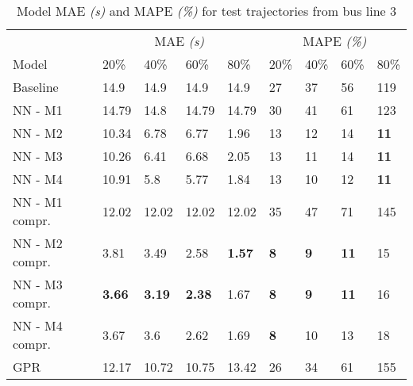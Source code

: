\begin{table}[H]
  \centering
  \caption{Model MAE \textit{(s)} and MAPE \textit{(\%)} for test trajectories from bus line 3}
  \label{tbl:models-mae-and-mape-203}
  \begin{tabular}{l | l | l | l | l || l | l | l | l }
    & \multicolumn{4}{c}{MAE \textit{(s)}} & \multicolumn{4}{c}{MAPE \textit{(\%)}} \\
    Model      & 20\% & 40\% & 60\% & 80\% & 20\% & 40\% & 60\% & 80\% \\
    \hline
    Baseline & 14.9 & 14.9 & 14.9 & 14.9  & 27 & 37 & 56 & 119 \\
    NN - M1        & 14.79& 14.8& 14.79& 14.79& 30& 41& 61& 123 \\
    NN - M2        & 10.34& 6.78& 6.77& 1.96& 13& 12& 14& \textbf{11} \\
    NN - M3       & 10.26& 6.41& 6.68& 2.05& 13& 11& 14& \textbf{11}\\
    NN - M4        & 10.91& 5.8& 5.77& 1.84& 13& 10& 12& \textbf{11} \\
    NN - M1 compr.       & 12.02& 12.02& 12.02& 12.02& 35& 47& 71& 145 \\
    NN - M2 compr.       & 3.81& 3.49& 2.58& \textbf{1.57}& \textbf{8}& \textbf{9}& \textbf{11}& 15 \\
    NN - M3 compr.       & \textbf{3.66}& \textbf{3.19}& \textbf{2.38}& 1.67& \textbf{8}& \textbf{9}& \textbf{11}& 16 \\
    NN - M4 compr.       & 3.67& 3.6& 2.62& 1.69& \textbf{8} & 10& 13& 18 \\
    GPR        &  12.17 & 10.72 & 10.75 & 13.42 & 26 &  34 & 61 &  155  \\
  \end{tabular}
\end{table}

